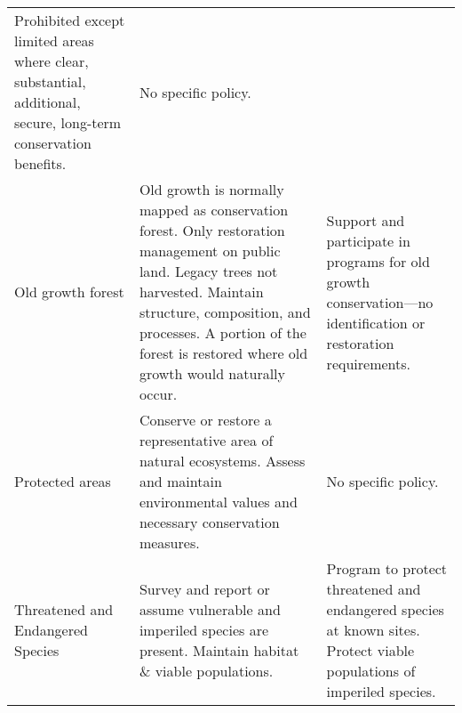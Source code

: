 \begin{table}
\begin{longtable*}[]{@{}lll@{}}
\begin{minipage}[t]{0.36\columnwidth}
Prohibited except limited areas where clear, substantial, additional,
secure, long-term conservation benefits.\strut
\end{minipage} & \begin{minipage}[t]{0.36\columnwidth}\raggedright\strut
No specific policy.\strut
\end{minipage}\tabularnewline
\begin{minipage}[t]{0.20\columnwidth}\raggedright\strut
Old growth forest\strut
\end{minipage} & \begin{minipage}[t]{0.36\columnwidth}\raggedright\strut
Old growth is normally mapped as conservation forest. Only restoration
management on public land. Legacy trees not harvested. Maintain
structure, composition, and processes. A portion of the forest is
restored where old growth would naturally occur.\strut
\end{minipage} & \begin{minipage}[t]{0.36\columnwidth}\raggedright\strut
Support and participate in programs for old growth conservation---no
identification or restoration requirements.\strut
\end{minipage}\tabularnewline
\begin{minipage}[t]{0.20\columnwidth}\raggedright\strut
Protected areas\strut
\end{minipage} & \begin{minipage}[t]{0.36\columnwidth}\raggedright\strut
Conserve or restore a representative area of natural ecosystems. Assess
and maintain environmental values and necessary conservation
measures.\strut
\end{minipage} & \begin{minipage}[t]{0.36\columnwidth}\raggedright\strut
No specific policy.\strut
\end{minipage}\tabularnewline
\begin{minipage}[t]{0.20\columnwidth}\raggedright\strut
Threatened and Endangered Species\strut
\end{minipage} & \begin{minipage}[t]{0.36\columnwidth}\raggedright\strut
Survey and report or assume vulnerable and imperiled species are
present. Maintain habitat \& viable populations.\strut
\end{minipage} & \begin{minipage}[t]{0.36\columnwidth}\raggedright\strut
Program to protect threatened and endangered species at known sites.
Protect viable populations of imperiled species.\strut
\end{minipage}\tabularnewline

\end{longtable*}
\end{table}
